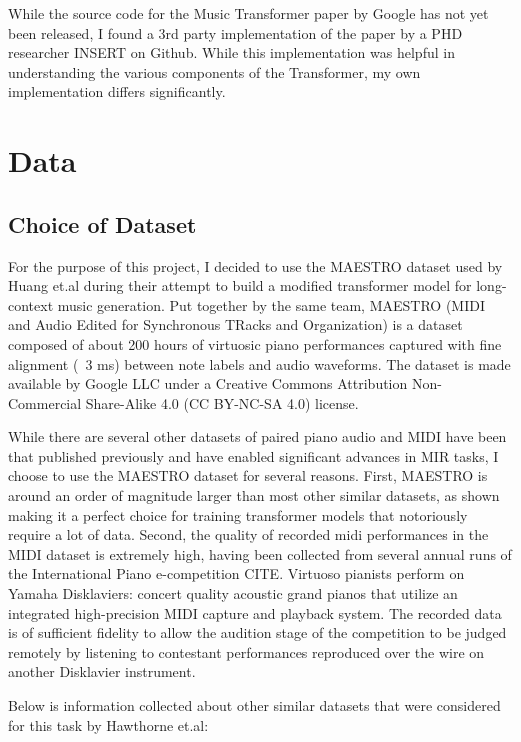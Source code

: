 \documentclass[../main.tex]{subfiles}
\begin{document}
While the source code for the Music Transformer paper by Google has not yet been released, I found a 3rd party implementation of the paper by a PHD researcher {INSERT} on Github. While this implementation was helpful in understanding the various components of the Transformer, my own implementation differs significantly.

\chapter{Data}

\section{Choice of Dataset}
For the purpose of this project, I decided to use the MAESTRO dataset\cite{hawthorne:1} used by Huang et.al \cite{Huang:1} during their attempt to build a modified transformer model for long-context music generation. Put together by the same team, MAESTRO (MIDI and Audio Edited for Synchronous TRacks and Organization) is a dataset composed of about 200 hours of virtuosic piano performances captured with fine alignment (~3 ms) between note labels and audio waveforms. The dataset is made available by Google LLC under a Creative Commons Attribution Non-Commercial Share-Alike 4.0 (CC BY-NC-SA 4.0) license.

While there are several other datasets of paired piano audio and MIDI have been that published previously and have enabled significant advances in MIR tasks, I choose to use the MAESTRO dataset for several reasons. First, MAESTRO is around an order of magnitude larger than most other similar datasets, as shown making it a perfect choice for training transformer models that notoriously require a lot of data. Second, the quality of recorded midi performances in the MIDI dataset is extremely high, having been collected from several annual runs of the International Piano e-competition {CITE}. Virtuoso pianists perform on Yamaha Disklaviers: concert quality acoustic grand pianos that utilize an integrated high-precision MIDI capture and playback system. The recorded data is of sufficient fidelity to allow the audition stage of the competition to be judged remotely by listening to contestant performances reproduced over the wire on another Disklavier instrument.  

Below is information collected about other similar datasets that were considered for this task by Hawthorne et.al\cite{hawthorne:1}:
\end{document}
